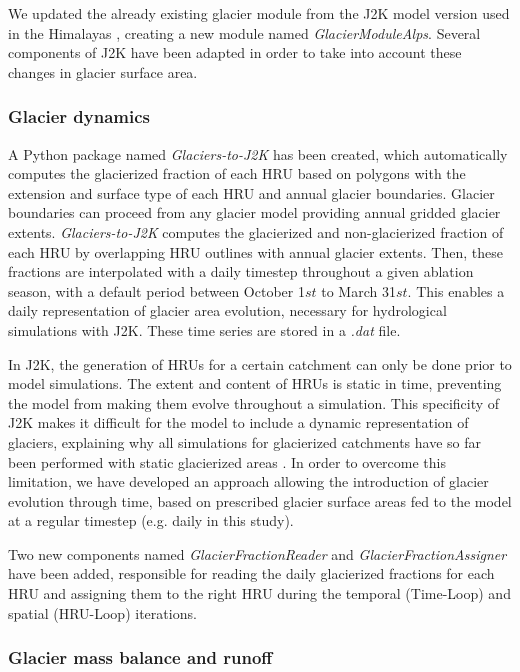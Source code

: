 We updated the already existing glacier module from the J2K model version used in the Himalayas \citep{nepal_understanding_2014}, creating a new module named \textit{GlacierModuleAlps}. Several components of J2K have been adapted in order to take into account these changes in glacier surface area. 

\subsubsection{Glacier dynamics}

A Python package named \textit{Glaciers-to-J2K} has been created, which automatically computes the glacierized fraction of each HRU based on polygons with the extension and surface type of each HRU and annual glacier boundaries. Glacier boundaries can proceed from any glacier model providing annual gridded glacier extents. \textit{Glaciers-to-J2K} computes the glacierized and non-glacierized fraction of each HRU by overlapping HRU outlines with annual glacier extents. Then, these fractions are interpolated with a daily timestep throughout a given ablation season, with a default period between October 1${st}$ to March 31${st}$. This enables a daily representation of glacier area evolution, necessary for hydrological simulations with J2K. These time series are stored in a \textit{.dat} file.

In J2K, the generation of HRUs for a certain catchment can only be done prior to model simulations. The extent and content of HRUs is static in time, preventing the model from making them evolve throughout a simulation. This specificity of J2K makes it difficult for the model to include a dynamic representation of glaciers, explaining why all simulations for glacierized catchments have so far been performed with static glacierized areas \citep{gao_test_2012, nepal_understanding_2014}. In order to overcome this limitation, we have developed an approach allowing the introduction of glacier evolution through time, based on prescribed glacier surface areas fed to the model at a regular timestep (e.g. daily in this study). 

Two new components named \textit{GlacierFractionReader} and \textit{GlacierFractionAssigner} have been added, responsible for reading the daily glacierized fractions for each HRU and assigning them to the right HRU during the temporal (Time-Loop) and spatial (HRU-Loop) iterations. 

\subsubsection{Glacier mass balance and runoff}

